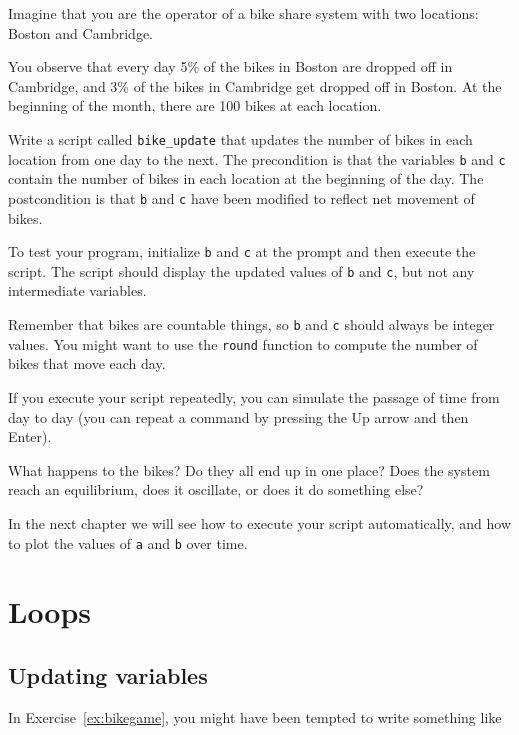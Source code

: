\documentclass[
]{book}
\numberwithin{Answer}{chapter}
\numberwithin{Exercise}{chapter}
\begin{document}
\begin{ex}
\label{ex:bikegame}

Imagine that you are the operator of a bike share system with two
locations: Boston and Cambridge.

You observe that every day 5\%
of the bikes in Boston are dropped off in Cambridge, and 3\% of the bikes
in Cambridge get dropped off in Boston.
At the beginning of the month, there are 100 bikes at each location.

Write a script called \verb"bike_update" that updates the number
of bikes in each location from one day to the next.  The precondition
is that the variables {\tt b} and {\tt c} contain the number of bikes
in each location at the beginning of the day.  The postcondition
is that {\tt b} and {\tt c} have been modified to reflect net movement of bikes.

To test your program, initialize {\tt b} and {\tt c} at
the prompt and then execute the script.  The script should display
the updated values of {\tt b} and {\tt c}, but not any intermediate
variables.

Remember that bikes are countable things, so {\tt b} and {\tt c} should always
be integer values.  You might want to use the {\tt round} function
to compute the number of bikes that move each day.

If you execute your script repeatedly, you can simulate the passage
of time from day to day (you can repeat a command by pressing the {\sf Up} arrow and then {\sf Enter}).

What happens to the bikes?  Do they all end up in one place?  Does the system reach an equilibrium, does it oscillate, or does it do something else?

In the next chapter we will see how to execute your script automatically,
and how to plot the values of {\tt a} and {\tt b} over time.
\end{ex}



\chapter{Loops}

\section{Updating variables}

In Exercise~\ref{ex:bikegame}, you might have been tempted to write something
like
\end{document}
